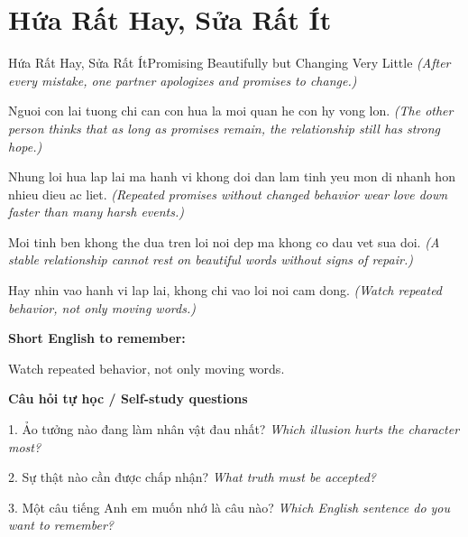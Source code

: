 \section{Hứa Rất Hay, Sửa Rất Ít}
\begin{truyen}{Hứa Rất Hay, Sửa Rất Ít}{Promising Beautifully but Changing Very Little}
\textit{(After every mistake, one partner apologizes and promises to change.)}

Nguoi con lai tuong chi can con hua la moi quan he con hy vong lon.
\textit{(The other person thinks that as long as promises remain, the relationship still has strong hope.)}

Nhung loi hua lap lai ma hanh vi khong doi dan lam tinh yeu mon di nhanh hon nhieu dieu ac liet.
\textit{(Repeated promises without changed behavior wear love down faster than many harsh events.)}

Moi tinh ben khong the dua tren loi noi dep ma khong co dau vet sua doi.
\textit{(A stable relationship cannot rest on beautiful words without signs of repair.)}

\end{truyen}

\begin{baihoc}
Hay nhin vao hanh vi lap lai, khong chi vao loi noi cam dong.
\textit{(Watch repeated behavior, not only moving words.)}
\end{baihoc}

\begin{ghinhoanh}
\textbf{Short English to remember:}

Watch repeated behavior, not only moving words.

\end{ghinhoanh}

\begin{tuhocnhanh}
\textbf{Câu hỏi tự học / Self-study questions}

1. Ảo tưởng nào đang làm nhân vật đau nhất? \textit{Which illusion hurts the character most?}

2. Sự thật nào cần được chấp nhận? \textit{What truth must be accepted?}

3. Một câu tiếng Anh em muốn nhớ là câu nào? \textit{Which English sentence do you want to remember?}
\end{tuhocnhanh}
\ngancach


